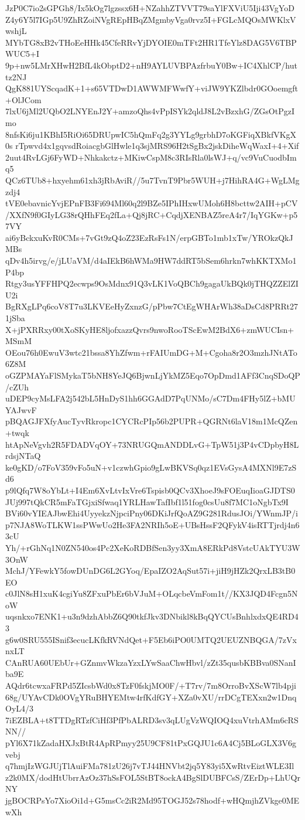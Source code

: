 JzP0C7io2sGPGh8/Ix5kOg7lgzssx6H+NZahhZTVVT79saYlFXViU5Iji43VgYoD
Z4y6Y5l7IGp5U9ZhRZoiNVgREpHBqZMgmbyVga0rvz5I+FGLcMQOsMWKlxVwshjL
MYbTG8xB2vTHoEeHHk45CfeRRvYjDYOIE0mTFt2HR1TfeYlz8DAG5V6TBPWUC5+I
9p+nw5LMrXHwH2BfL4kObptD2+nH9AYLUVBPAzfrbuY0Bw+IC4XhlCP/huttz2NJ
QgK881UYScqadK+1+s65VTDwD1AWWMFWwfY+viJW9YKZlbdr0GOoemgft+OlJCom
7lxU6jMl2UQbO2LNYEnJ2Y+amzoQhs4vPpISYk2qldJ8L2vBzxhG/ZGsOtPgzImo
8nfsKi6ju1KBhI5RiOi65DRUpwIC5hQmFq2g3YYLg9grbhD7oKGFiqXBkfVKgX0s
rTpwvd4x1gqvsdRoiacgbGlHwle1q3sjMRS96H2tSgBx2jskDiheWqWaxI+4+Xif
2uut4RvLGj6FyWD+Nhkakctz+MKiwCspM8c3RIsRla0lsWJ+q/vc9VuCuodbImq5
QCz6TUb8+hxyehm61xh3jRbAviR//5u7TvnT9Pbr5WUH+j7HihRA4G+WgLMgzdj4
tVE0ebavnicYvjEPnFB3Fi694Ml60q2l9BZe5IPhIHxwUMoh6H8bcttw2AIH+pCV
/XXfN9f0GIyLG38rQHhFEq2fLa+Qj8jRC+CqdjXENBAZ5reA4r7/IqYGKw+p57VY
ai6yBckxuKvR0CMs+7vGt9zQ4oZ23EzRsFs1N/erpGBTo1mb1xTw/YROkzQkJMBs
qDv4h5irvg/e/jLUaVM/d4aIEkB6hWMa9HW7ddRT5bSem6hrkn7whKKTXMo1P4bp
Rtgy3usYFFHPQ2ecwps9OsMdnx91Q3vLK1VoQBCh9gagaUkBQk0jTHQZZElZIU2i
BgRXgLPq6coV8T7u3LKVEeHyZxnzG/pPbw7CtEgWHArWh38aDsCd8PRRt271jSba
X+jPXRRxy00tXoSKyHE8ljofxazzQvrs9nwoRooTScEwM2BdX6+zmWUCIsn+MSmM
OEou76h0EwuV3wtc21bssa8YhZfwm+rFAIUmDG+M+Cgoha8r2O3mzhJNtATo6Z8M
oGZPMAYaFlSMykaT5bNH8YeJQ6BjwnLjYkMZ5Eqo7OpDmd1AFf3CnqSDoQP/cZUh
uDEP9cyMsLFA2j542bL5HnDyS1hh6GGAdD7PqUNMo/sC7Dm4FHy5lZ+bMUYAJwvF
pBQAGJFXfyAucTyvRkropc1CYCRcPIp56b2PUPR+QGRNt6laV18m1McQZen+twqk
htApNeVgvh2R5FDADVqOY+73NRUGQmANDDLvG+TpW51j3P4vCDpbyH8LrdsjNTaQ
ke0gKD/o7FoV359vFo5uN+v1czwhGpio9gLwBKVSq0qz1EVsGysA4MXNl9E7zSd6
p9lQfq7W8oYbLt+I4Em6XvLtvIxVre6Tspisb0QCv3XhoeJ9sFOEuqIioaGJDTS0
JUj997tQkCR5mFaTGjxiSfwaq1YRLHawTafIbf1l51fog0csUu8f7MC1oNgbTx9I
BVi60vYIEAJbwEhi4UyyekzNjpciPny06DKiJrfQoAZ9G281RdusJOi/YWnmJP/i
p7NJA8WoTLKW1ssPWwUo2He3FA2NRIh5oE+UBsHssF2QFykV4isRTTjrdj4n63cU
Yh/+rGhNq1N0ZN540os4Pc2XeKoRDBfSen3yy3XmA8ERkPd8VstcUAkTYU3W3OnW
MchJ/YFewkY5fowDUnDG6L2GYoq/EpaIZO2AqSut57i+jiH9jHZk2QrxLB3tB0EO
c0JlN8sH1xuK4cgiYu8ZFxuPbEr6bVJuM+OLqcbeVmFom1t//KX3JQD4Fcgn5NoW
uqsnkxo7ENK1+u3n9dzhAbbZ6Q90tkfJkv3DNbikl8kBqQYCUsBnhlxdxQE4RD43
g6w0SRU555ISnif3ecucLKfkRVNdQet+F5Eb6iPO0UMTQ2UEUZNBQGA/7zVxnxLT
CAnRUA60UEbUr+GZnmvWkzaYzxLYwSaaChwHbvl/zZt35qusbKBBva0SNanIba9E
AQdr6tcwxaFRPd5ZIcsbWd0x8TzF0fskjMO0F/+T7rv/7m8OrroBvXScW7lb4pji
68g/UYAvCDk0OVgYRuBHYEMtw4rfKdfGY+XZa0vXU/rrDCgTEXxn2w1DnqOyL4/3
7iEZBLA+t8TTDgRTzfCiHf3PfPbALRD3sv3qLUgVzWQIOQ4xuVtrhAMm6cRSNN//
pYl6X71kZadaHXJxBtR4ApRPmyy25U9CF81tPxGQJU1c6A4Cj5BLoGLX3V6gvebj
q7hmjIzWGJUjTlAuiFMa781zU26j7vTJ44HNVbt2jq5Y83yi5XwRtvEiztWLE3Il
z2k0MX/dodHtUbrrAzOz37hSsFOL5StBT8ockA4BgSlDUBFCsS/ZErDp+LhUQrNY
jgBOCRPsYo7XioOi1d+G5msCc2iR2Md95TOGJ52s78hodf+wHQmjhZVkge0MEwXh
